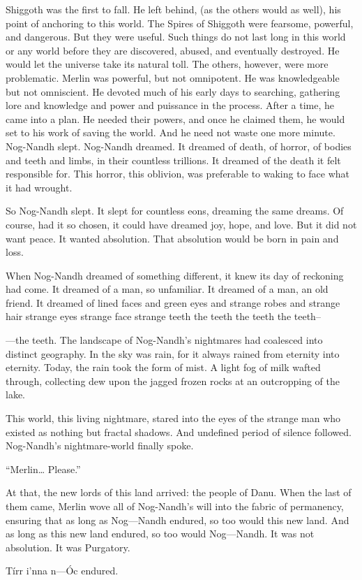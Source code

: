 \SomeVSpace
Shiggoth was the first to fall. He left behind, (as the others would as well), his point of anchoring to this world. The Spires of Shiggoth were fearsome, powerful, and dangerous. But they were useful. Such things do not last long in this world or any world before they are discovered, abused, and eventually destroyed. He would let the universe take its natural toll.
\SomeVSpace
The others, however, were more problematic. Merlin was powerful, but not omnipotent. He was knowledgeable but not omniscient. He devoted much of his early days to searching, gathering lore and knowledge and power and puissance in the process. After a time, he came into a plan. He needed their powers, and once he claimed them, he would set to his work of saving the world. And he need not waste one more minute.
\simpleline
\simpleline
Nog-Nandh slept. Nog-Nandh dreamed. It dreamed of death, of horror, of bodies and teeth and limbs, in their countless trillions. It dreamed of the death it felt responsible for. This horror, this oblivion, was preferable to waking to face what it had wrought.

So Nog-Nandh slept. It slept for countless eons, dreaming the same dreams. Of course, had it so chosen, it could have dreamed joy, hope, and love. But it did not want peace. It wanted absolution. That absolution would be born in pain and loss.

When Nog-Nandh dreamed of something different, it knew its day of reckoning had come. It dreamed of a man, so unfamiliar. It dreamed of a man, an old friend. It dreamed of lined faces and green eyes and strange robes and strange hair strange eyes strange face strange teeth the teeth the teeth the teeth\mbox{--}

\simpleline


\mbox{---}the teeth. The landscape of Nog-Nandh’s nightmares had coalesced into distinct geography. In the sky was rain, for it always rained from eternity into eternity. Today, the rain took the form of mist. A light fog of milk wafted through, collecting dew upon the jagged frozen rocks at an outcropping of the lake.

This world, this living nightmare, stared into the eyes of the strange man who existed as nothing but fractal shadows. And undefined period of silence followed. Nog-Nandh’s nightmare-world finally spoke.

“Merlin… Please.”

At that, the new lords of this land arrived: the people of Danu. When the last of them came, Merlin wove all of Nog-Nandh’s will into the fabric of permanency, ensuring that as long as Nog\mbox{---}Nandh endured, so too would this new land. And as long as this new land endured, so too would Nog\mbox{---}Nandh. It was not absolution. It was Purgatory.

Tírr i’nna n\mbox{---}Óc endured.